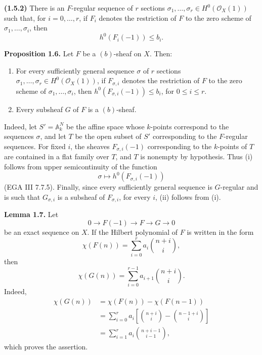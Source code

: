\noindent{}\textbf{(1.5.2)} There is an \(F\)-regular sequence of \(r\)
sections \(\sigma_1,\ldots,\sigma_r\in H^0(\mathcal O_X(1))\) such that,
for \(i=0,\ldots,r\), if \(F_i\) denotes the restriction of \(F\) to the
zero scheme of \(\sigma_1,\ldots,\sigma_i\), then
\[
  h^0(F_i(-1))\leq b_i.
\]

\textbf{Proposition 1.6.} Let \(F\) be a \((b)\)-sheaf on \(X\). Then:
\begin{enumerate}[label=(\roman*)]
\item For every sufficiently general sequence \(\sigma\) of \(r\) sections
\(\sigma_1,\ldots,\sigma_r\in H^0(\mathcal O_X(1))\), if
\(F_{\sigma,i}\) denotes the restriction of \(F\) to the zero scheme of
\(\sigma_1,\ldots,\sigma_i\), then
\(h^0(F_{\sigma,i}(-1))\leq b_i\), for \(0\leq i\leq r\).
\item Every subsheaf \(G\) of \(F\) is a \((b)\)-sheaf.
\end{enumerate}

\newpage
Indeed, let \(S'=\mathbb A_k^N\) be the affine space whose \(k\)-points
correspond to the sequences \(\sigma\), and let \(T\) be the open subset of
\(S'\) corresponding to the \(F\)-regular sequences. For fixed \(i\), the
sheaves \(F_{\sigma,i}(-1)\) corresponding to the \(k\)-points of \(T\) are
contained in a flat family over \(T\), and \(T\) is nonempty by hypothesis.
Thus (i) follows from upper semicontinuity of the function
\[
  \sigma\longmapsto h^0(F_{\sigma,i}(-1))
\]
(EGA III 7.7.5). Finally, since every sufficiently general sequence is
\(G\)-regular and is such that \(G_{\sigma,i}\) is a subsheaf of
\(F_{\sigma,i}\), for every \(i\), (ii) follows from (i).

\textbf{Lemma 1.7.} Let
\[
  0\longrightarrow F(-1)\longrightarrow F\longrightarrow G\longrightarrow0
\]
be an exact sequence on \(X\). If the Hilbert polynomial of \(F\) is written
in the form
\[
  \chi(F(n))=\sum_{i=0}^{r}a_i\binom{n+i}{i},
\]
then
\[
  \chi(G(n))=\sum_{i=0}^{r-1}a_{i+1}\binom{n+i}{i}.
\]
Indeed,
\[
\begin{aligned}
  \chi(G(n))
  &=\chi(F(n))-\chi(F(n-1))\\
  &=\sum_{i=0}^{r}a_i
    \left[\binom{n+i}{i}-\binom{n-1+i}{i}\right]\\
  &=\sum_{i=1}^{r}a_i\binom{n+i-1}{i-1},
\end{aligned}
\]
which proves the assertion.


